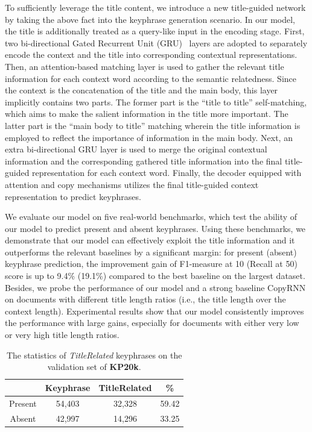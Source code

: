 \documentclass[letterpaper]{article} %
\begin{document}
To sufficiently leverage the title content, we introduce a new title-guided network by taking the above fact into the keyphrase generation scenario. In our model, the title is additionally treated as a query-like input in the encoding stage. First, two bi-directional Gated Recurrent Unit (GRU)~\cite{cho2014learning} layers are adopted to separately encode the context and the title into corresponding contextual representations. Then, an attention-based matching layer is used to gather the relevant title information for each context word according to the semantic relatedness. Since the context is the concatenation of the title and the main body, this layer implicitly contains two parts. The former part is the ``title to title'' self-matching, which aims to make the salient information in the title more important. The latter part is the ``main body to title'' matching wherein the title information is employed to reflect the importance of information in the main body. Next, an extra bi-directional GRU layer is used to merge the original contextual information and the corresponding gathered title information into the final title-guided representation for each context word. Finally, the decoder equipped with attention and copy mechanisms utilizes the final title-guided context representation to predict keyphrases.

We evaluate our model on five real-world benchmarks, which test the ability of our model to predict present and absent keyphrases. Using these benchmarks, we demonstrate that our model can effectively exploit the title information and it outperforms the relevant baselines by a significant margin: for present (absent) keyphrase prediction, the improvement gain of F1-measure at 10 (Recall at 50) score is up to 9.4\% (19.1\%) compared to the best baseline on the largest dataset. Besides, we probe the performance of our model and a strong baseline CopyRNN on documents with different title length ratios (i.e., the title length over the context length). Experimental results show that our model consistently improves the performance with large gains, especially for documents with either very low or very high title length ratios.

\begin{table}[t]
\centering
\begin{tabular}{ c c c c}
\hline
\hline
 & Keyphrase & TitleRelated & \% \\
\hline
Present & 54,403 & 32,328 & 59.42 \\
\hline
Absent & 42,997  & 14,296 & 33.25\\
\hline
\end{tabular}
\caption{The statistics of \textit{TitleRelated} keyphrases on the validation set of \textbf{KP20k}.}
\label{table:statistic_study_on_val_set}
\end{table}
\end{document}
